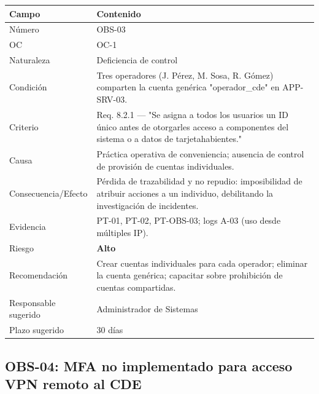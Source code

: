 \documentclass[11pt,a4paper]{article}
\begin{document}
\begin{tabularx}{\textwidth}{P{5cm}L}
\toprule
\textbf{Campo} & \textbf{Contenido} \\
\midrule
Número & OBS-03 \\
OC & OC-1 \\
Naturaleza & Deficiencia de control \\
Condición & Tres operadores (J. Pérez, M. Sosa, R. Gómez) comparten la cuenta genérica "operador_cde" en APP-SRV-03. \\
Criterio & Req. 8.2.1 — "Se asigna a todos los usuarios un ID único antes de otorgarles acceso a componentes del sistema o a datos de tarjetahabientes." \\
Causa & Práctica operativa de conveniencia; ausencia de control de provisión de cuentas individuales. \\
Consecuencia/Efecto & Pérdida de trazabilidad y no repudio: imposibilidad de atribuir acciones a un individuo, debilitando la investigación de incidentes. \\
Evidencia & PT-01, PT-02, PT-OBS-03; logs A-03 (uso desde múltiples IP). \\
Riesgo & \textbf{Alto} \\
Recomendación & Crear cuentas individuales para cada operador; eliminar la cuenta genérica; capacitar sobre prohibición de cuentas compartidas. \\
Responsable sugerido & Administrador de Sistemas \\
Plazo sugerido & 30 días \\
\bottomrule
\end{tabularx}

\subsection{OBS-04: MFA no implementado para acceso VPN remoto al CDE}
\end{document}
